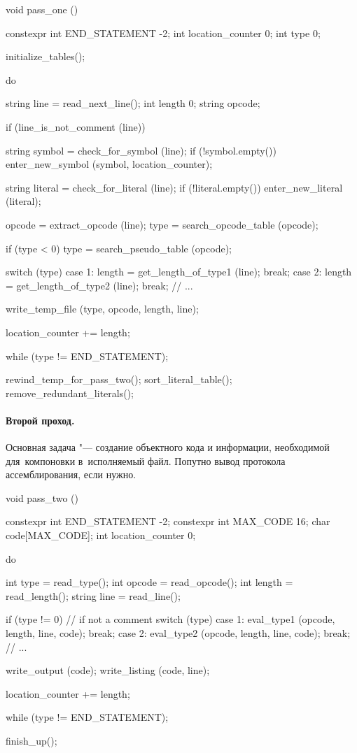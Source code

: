 \begin{cppcode}
void pass_one ()
{
  constexpr int END_STATEMENT {-2};
  int location_counter {0};
  int type {0};

  initialize_tables();

  do {
    string line = read_next_line();
    int length {0};
    string opcode;

    if (line_is_not_comment (line))
    {
      string symbol = check_for_symbol (line);
      if (!symbol.empty())
        enter_new_symbol (symbol, location_counter);

      string literal = check_for_literal (line);
      if (!literal.empty())
      enter_new_literal (literal);

      opcode = extract_opcode (line);
      type = search_opcode_table (opcode);

      if (type < 0)
        type = search_pseudo_table (opcode);

      switch (type)
      {
        case 1: length = get_length_of_type1 (line); break;
        case 2: length = get_length_of_type2 (line); break;
        // ...
      }
    }

    write_temp_file (type, opcode, length, line);

    location_counter += length;

  } while (type != END_STATEMENT);

  rewind_temp_for_pass_two();
  sort_literal_table();
  remove_redundant_literals();
}
\end{cppcode}



\paragraph{Второй проход.}
Основная задача "--- создание объектного кода и информации, необходимой для~компоновки в~исполняемый файл. Попутно вывод протокола ассемблирования, если нужно.

\begin{cppcode}
void pass_two ()
{
  constexpr int END_STATEMENT {-2};
  constexpr int MAX_CODE {16};
  char code[MAX_CODE];
  int location_counter {0};

  do {
    int type = read_type();
    int opcode = read_opcode();
    int length = read_length();
    string line = read_line();

    if (type != 0)  // if not a comment
    {
      switch (type)
      {
        case 1: eval_type1 (opcode, length, line, code); break;
        case 2: eval_type2 (opcode, length, line, code); break;
        // ...
      }
    }

    write_output (code);
    write_listing (code, line);

    location_counter += length;

  } while (type != END_STATEMENT);

  finish_up();
}
\end{cppcode}



